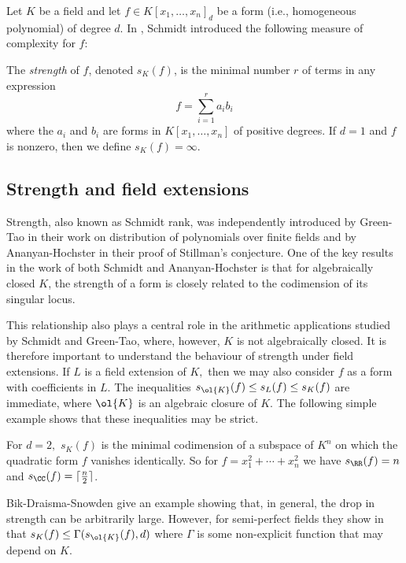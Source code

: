 \documentclass{amsart}
\newcommand{\ceil}[1]{\lceil #1 \rceil}
\begin{document}
Let $K$ be a field
and let $f \in K[x_1,\ldots,x_n]_d$ be a form (i.e., homogeneous
polynomial) of degree $d$. In \cite{Schmidt85}, Schmidt introduced the following measure of complexity for $f$:

\begin{de}
The {\em strength} of $f$, denoted $s_K(f)$, is the minimal number $r$
of terms in any expression
\[ f=\sum_{i=1}^r a_i b_i \]
where the $a_i$ and $b_i$ are forms in $K[x_1,\ldots,x_n]$ of positive degrees. If $d=1$ and $f$ is nonzero, then we define $s_K(f)=\infty$.  
\end{de}

\subsection{Strength and field extensions}


Strength, also known as Schmidt rank, was independently introduced by
Green-Tao in their work on distribution of polynomials over finite fields
\cite{Green09} and by Ananyan-Hochster in their proof of Stillman's
conjecture\cite{Hochster16}. One of the key results in the work of both
Schmidt and Ananyan-Hochster is that for algebraically closed $K$,
the strength of a form is closely related to the codimension of its
singular locus.

This relationship also plays a central role in the arithmetic
applications studied by Schmidt and Green-Tao, where, however, $K$ is
not algebraically closed. It is therefore
important to understand the behaviour of strength under field
extensions. If $L$ is a field extension of $K,$ then we may also
consider $f$ as a form with coefficients in $L.$ The inequalities
$s_{\ol{K}}(f) \le s_L(f)\le s_K(f)$ are immediate, where $\ol{K}$ is
an algebraic closure of $K$. The following simple example shows that
these inequalities may be strict.

\begin{ex} \label{ex:Quadric}
For $d=2,$ $s_K(f)$ is the minimal codimension
of a subspace of $K^n$ on which the quadratic form $f$ vanishes
identically. So for $f=x_1^2+\cdots+x_n^2$ we have $s_\RR(f)=n$ and
$s_\CC(f)=\ceil{\frac{n}{2}}$.
\end{ex}

Bik-Draisma-Snowden give an example \cite[Example 3.4]{Draisma24a}
showing that, in general, the drop in strength can be arbitrarily large.
However, for semi-perfect fields they show in \cite[Theorem 1.3]{Bik24}
that $s_K(f) \le \Gamma(s_{\ol{K}}(f),d)$ where $\Gamma$ is some
non-explicit function that may depend on $K$.
\end{document}
